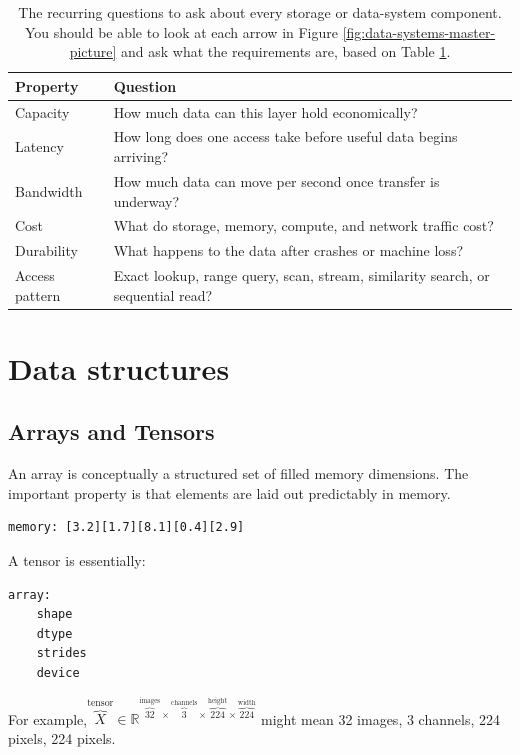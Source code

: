 \begin{table}[htbp]
\centering
\caption{The recurring questions to ask about every storage or data-system component. 
You should be able to look at each arrow in Figure \ref{fig:data-systems-master-picture} and ask what the requirements are, based on Table \ref{tab:data-systems-six-questions}.
}
\label{tab:data-systems-six-questions}
\begin{tabularx}{\linewidth}{@{}lX@{}}
\toprule
\textbf{Property} & \textbf{Question} \\
\midrule
Capacity & How much data can this layer hold economically? \\
Latency & How long does one access take before useful data begins arriving? \\
Bandwidth & How much data can move per second once transfer is underway? \\
Cost & What do storage, memory, compute, and network traffic cost? \\
Durability & What happens to the data after crashes or machine loss? \\
Access pattern & Exact lookup, range query, scan, stream, similarity search, or sequential read? \\
\bottomrule
\end{tabularx}
\end{table}

\clearpage
\section{Data structures}
\label{sec:data-structures}

\subsection{Arrays and Tensors}
\label{subsec:arrays-native-language}
An array is conceptually a structured set of filled memory dimensions. 
The important property is that elements are laid out predictably in memory.
\begin{verbatim}
memory: [3.2][1.7][8.1][0.4][2.9]
\end{verbatim}

A tensor is essentially:
\begin{verbatim}
array:
    shape
    dtype
    strides
    device
\end{verbatim}

For example,$\overbrace{X}^{\text{tensor}} \in
\mathbb{R}^{\overbrace{32}^{\text{images}}
\times \overbrace{3}^{\text{channels}}
\times \overbrace{224}^{\text{height}}
\times \overbrace{224}^{\text{width}}}$
might mean 32 images, 3 channels, 224 pixels, 224 pixels.

